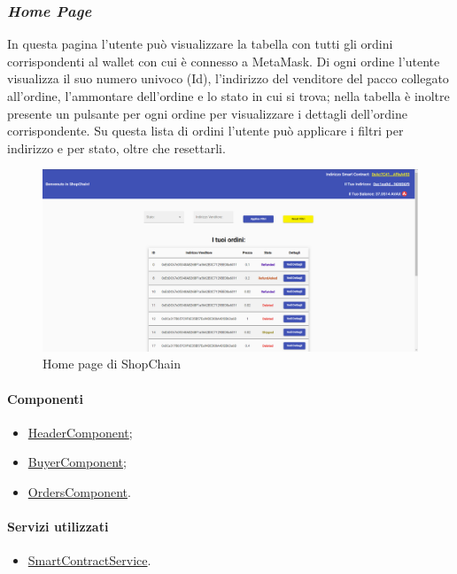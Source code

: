 \newpage

\subsubsection*{\textit{Home Page}}
In questa pagina l'utente può visualizzare la tabella con tutti gli ordini corrispondenti al wallet con cui è connesso a MetaMask. Di ogni ordine l'utente visualizza il suo numero univoco (Id), l'indirizzo del venditore del pacco collegato all'ordine, l'ammontare dell'ordine e lo stato in cui si trova; nella tabella è inoltre presente un pulsante per ogni ordine per visualizzare i dettagli dell'ordine corrispondente. Su questa lista di ordini l'utente può applicare i filtri per indirizzo e per stato, oltre che resettarli.

\begin{figure}[!h] 
    \centering 
    \includegraphics[width=1\columnwidth]{immagini/maschere/homepage.png} 
    \caption{Home page di ShopChain}
\end{figure}

\paragraph{Componenti}
\begin{itemize}
    \item \hyperref[sec:header-component]{HeaderComponent};
    \item \hyperref[sec:buyer-component]{BuyerComponent};
    \item \hyperref[sec:orders-component]{OrdersComponent}.
\end{itemize}

\paragraph{Servizi utilizzati}
\begin{itemize}
    \item \hyperref[sec:smart-contract-service]{SmartContractService}.
\end{itemize}

